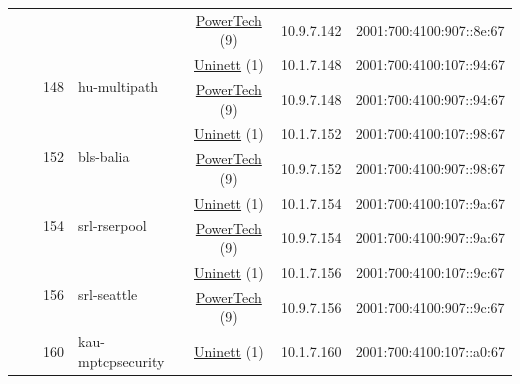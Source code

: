 \begin{small}
\begin{center}
\begin{longtable}{|c|c|c|c|c|c|c|c|}
  &  &  &  & \multicolumn{2}{|c|}{\tiny{\href{http://www.powertech.no}{PowerTech} (9)}} & \tiny{10.9.7.142} & \tiny{2001:700:4100:907::8e:67} \\* \cline{3-3}\cline{4-4}\cline{5-5}\cline{6-6}\cline{7-7}\cline{8-8}
  &  & \multirow{2}{*}{\tiny{148}} & \multicolumn{1}{|l|}{\multirow{2}{*}{\tiny{hu-multipath}}} & \multicolumn{2}{|c|}{\tiny{\href{https://www.uninett.no}{Uninett} (1)}} & \tiny{10.1.7.148} & \tiny{2001:700:4100:107::94:67} \\* \cline{5-5}\cline{6-6}\cline{7-7}\cline{8-8}
  &  &  &  & \multicolumn{2}{|c|}{\tiny{\href{http://www.powertech.no}{PowerTech} (9)}} & \tiny{10.9.7.148} & \tiny{2001:700:4100:907::94:67} \\* \cline{3-3}\cline{4-4}\cline{5-5}\cline{6-6}\cline{7-7}\cline{8-8}
  &  & \multirow{2}{*}{\tiny{152}} & \multicolumn{1}{|l|}{\multirow{2}{*}{\tiny{bls-balia}}} & \multicolumn{2}{|c|}{\tiny{\href{https://www.uninett.no}{Uninett} (1)}} & \tiny{10.1.7.152} & \tiny{2001:700:4100:107::98:67} \\* \cline{5-5}\cline{6-6}\cline{7-7}\cline{8-8}
  &  &  &  & \multicolumn{2}{|c|}{\tiny{\href{http://www.powertech.no}{PowerTech} (9)}} & \tiny{10.9.7.152} & \tiny{2001:700:4100:907::98:67} \\* \cline{3-3}\cline{4-4}\cline{5-5}\cline{6-6}\cline{7-7}\cline{8-8}
  &  & \multirow{2}{*}{\tiny{154}} & \multicolumn{1}{|l|}{\multirow{2}{*}{\tiny{srl-rserpool}}} & \multicolumn{2}{|c|}{\tiny{\href{https://www.uninett.no}{Uninett} (1)}} & \tiny{10.1.7.154} & \tiny{2001:700:4100:107::9a:67} \\* \cline{5-5}\cline{6-6}\cline{7-7}\cline{8-8}
  &  &  &  & \multicolumn{2}{|c|}{\tiny{\href{http://www.powertech.no}{PowerTech} (9)}} & \tiny{10.9.7.154} & \tiny{2001:700:4100:907::9a:67} \\* \cline{3-3}\cline{4-4}\cline{5-5}\cline{6-6}\cline{7-7}\cline{8-8}
  &  & \multirow{2}{*}{\tiny{156}} & \multicolumn{1}{|l|}{\multirow{2}{*}{\tiny{srl-seattle}}} & \multicolumn{2}{|c|}{\tiny{\href{https://www.uninett.no}{Uninett} (1)}} & \tiny{10.1.7.156} & \tiny{2001:700:4100:107::9c:67} \\* \cline{5-5}\cline{6-6}\cline{7-7}\cline{8-8}
  &  &  &  & \multicolumn{2}{|c|}{\tiny{\href{http://www.powertech.no}{PowerTech} (9)}} & \tiny{10.9.7.156} & \tiny{2001:700:4100:907::9c:67} \\* \cline{3-3}\cline{4-4}\cline{5-5}\cline{6-6}\cline{7-7}\cline{8-8}
  &  & \multirow{2}{*}{\tiny{160}} & \multicolumn{1}{|l|}{\multirow{2}{*}{\tiny{kau-mptcpsecurity}}} & \multicolumn{2}{|c|}{\tiny{\href{https://www.uninett.no}{Uninett} (1)}} & \tiny{10.1.7.160} & \tiny{2001:700:4100:107::a0:67} \\* \cline{5-5}\cline{6-6}\cline{7-7}\cline{8-8}

\end{longtable}
\end{center}
\end{small}
